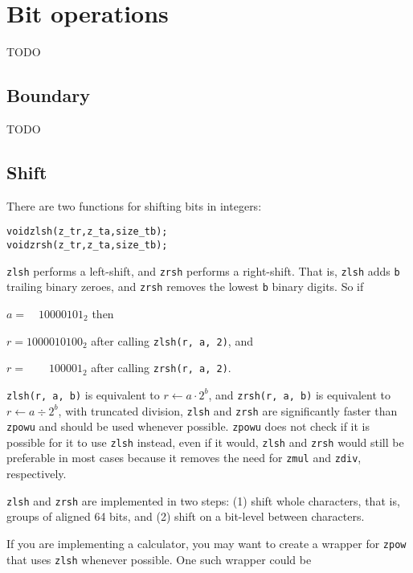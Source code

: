 \chapter{Bit operations}
\label{chap:Bit operations}

TODO

\vspace{1cm}
\minitoc


\newpage
\section{Boundary}
\label{sec:Boundary}

TODO %


\newpage
\section{Shift}
\label{sec:Shift}

There are two functions for shifting bits
in integers:

\begin{alltt}
   void zlsh(z_t r, z_t a, size_t b);
   void zrsh(z_t r, z_t a, size_t b);
\end{alltt}

\noindent
{\tt zlsh} performs a left-shift, and {\tt zrsh}
performs a right-shift. That is, {\tt zlsh} adds
{\tt b} trailing binary zeroes, and {\tt zrsh}
removes the lowest {\tt b} binary digits. So if

$a = \phantom{00}10000101_2$ then

$r = 1000010100_2$ after calling {\tt zlsh(r, a, 2)}, and

$r = \phantom{0100}100001_2$ after calling {\tt zrsh(r, a, 2)}.
\vspace{1em}

{\tt zlsh(r, a, b)} is equivalent to $r \gets a \cdot 2^b$,
and {\tt zrsh(r, a, b)} is equivalent to $r \gets a \div 2^b$,
with truncated division, {\tt zlsh} and {\tt zrsh} are
significantly faster than {\tt zpowu} and should be used
whenever possible. {\tt zpowu} does not check if it is
possible for it to use {\tt zlsh} instead, even if it
would, {\tt zlsh} and {\tt zrsh} would still be preferable
in most cases because it removes the need for {\tt zmul}
and {\tt zdiv}, respectively.

{\tt zlsh} and {\tt zrsh} are implemented in two steps:
(1) shift whole characters, that is, groups of aligned
64 bits, and (2) shift on a bit-level between characters.

If you are implementing a calculator, you may want to
create a wrapper for {\tt zpow} that uses {\tt zlsh}
whenever possible. One such wrapper could be

